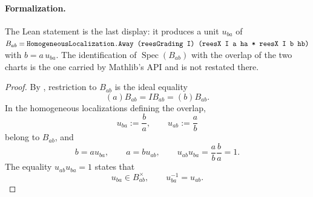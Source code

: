 \begin{lemma}
  \paragraph{Formalization.}
  The Lean statement is the last display: it produces a unit $u_{ba}$ of
  $B_{ab}=\texttt{\detokenize{HomogeneousLocalization.Away (reesGrading I) (reesX I a ha * reesX I b hb)}}$
  with $b=a\,u_{ba}$.  The identification of $\operatorname{Spec}(B_{ab})$ with
  the overlap of the two charts is the one carried by Mathlib's
  \texttt{} API and is not restated there.
\end{lemma}

\begin{proof}
  \leanok
  By , restriction to
  $B_{ab}$ is the ideal equality
  \[
    (a)B_{ab}=IB_{ab}=(b)B_{ab}.
  \]
  In the homogeneous localizations defining the overlap,
  \[
    u_{ba}:=\frac{b}{a},\qquad u_{ab}:=\frac{a}{b}
  \]
  belong to $B_{ab}$, and
  \[
    b=au_{ba},\qquad a=bu_{ab},\qquad
    u_{ab}u_{ba}=\frac ab\frac ba=1.
  \]
  The equality $u_{ab}u_{ba}=1$ states that
  \[
    u_{ba}\in B_{ab}^\times,
    \qquad u_{ba}^{-1}=u_{ab}.
  \]
\end{proof}

